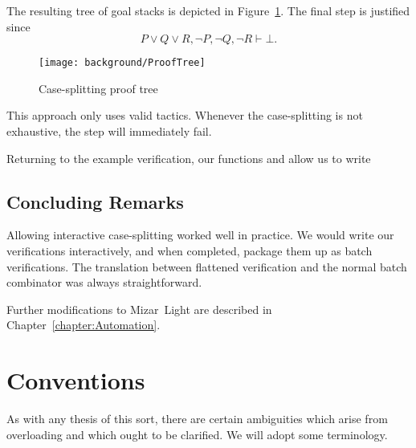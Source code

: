 The resulting tree of goal stacks is depicted in Figure~\ref{fig:CaseProofTree}. The final  step is justified since
\begin{displaymath}
P \vee Q \vee R, \neg P, \neg Q, \neg R \vdash \bot.
\end{displaymath}

\begin{figure}[h]
\begin{center}
\texttt{[image: background/ProofTree]}
\end{center}
\caption{Case-splitting proof tree}
\label{fig:CaseProofTree}
\end{figure}

This approach only uses valid tactics. Whenever the case-splitting is not exhaustive, the  step will immediately fail.

Returning to the example verification, our functions  and  allow us to write

\vspace{0.5cm}
\begin{minipage}{\linewidth}
  \footnotesize






\end{minipage}
\vspace{0.5cm}

\subsection{Concluding Remarks}
Allowing interactive case-splitting worked well in practice. We would write our verifications interactively, and when completed, package them up as batch verifications. The translation between flattened verification and the normal batch  combinator was always straightforward.

Further modifications to Mizar~Light are described in Chapter~\ref{chapter:Automation}.

\section{Conventions}\label{sec:Conventions}
As with any thesis of this sort, there are certain ambiguities which arise from overloading and which ought to be clarified. We will adopt some terminology.

